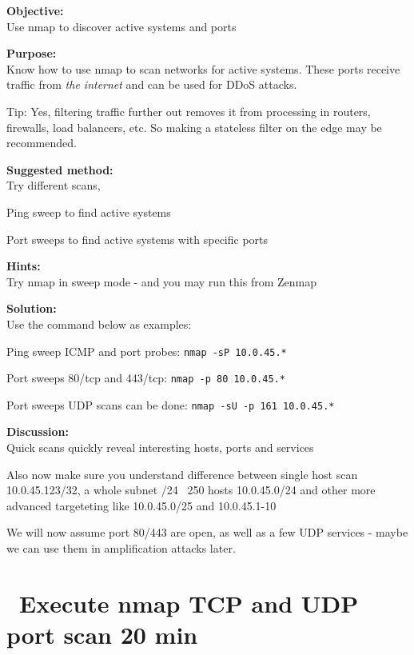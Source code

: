 \documentclass[a4paper,11pt,notitlepage]{report}
\begin{document}
{\bf Objective:}\\
Use nmap to discover active systems and ports

{\bf Purpose:}\\
Know how to use nmap to scan networks for active systems. These ports receive traffic from \emph{the internet} and can be used for DDoS attacks.

Tip: Yes, filtering traffic further out removes it from processing in routers, firewalls, load balancers, etc. So making a stateless filter on the edge may be recommended.

{\bf Suggested method:}\\
Try different scans,
\begin{list2}
\item Ping sweep to find active systems
\item Port sweeps to find active systems with specific ports
\end{list2}

{\bf Hints:} \\
Try nmap in sweep mode - and you may run this from Zenmap

{\bf Solution:}\\
Use the command below as examples:
\begin{list2}
\item Ping sweep ICMP and port probes: \verb+nmap -sP 10.0.45.*+
\item Port sweeps 80/tcp and 443/tcp: \verb+nmap -p 80 10.0.45.*+
\item Port sweeps UDP scans can be done: \verb+nmap -sU -p 161 10.0.45.*+
\end{list2}

{\bf Discussion:}\\
Quick scans quickly reveal interesting hosts, ports and services

Also now make sure you understand difference between single host scan
10.0.45.123/32, a whole subnet /24 ~250 hosts 10.0.45.0/24 and other more advanced targeteting like 10.0.45.0/25 and 10.0.45.1-10

We will now assume port 80/443 are open, as well as a few UDP services - maybe we can use them in amplification attacks later.



\chapter{\faExclamationTriangle\ Execute nmap TCP and UDP port scan 20 min}
\label{ex:nmap-synscan}
\end{document}
